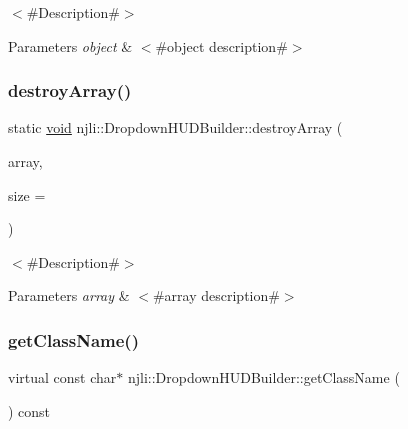 $<$\#\+Description\#$>$


\begin{DoxyParams}{Parameters}
{\em object} & $<$\#object description\#$>$ \\
\hline
\end{DoxyParams}
\mbox{\label{classnjli_1_1_dropdown_h_u_d_builder_a6bfd29a4923eae10fa7fa75941e13356}} 
\subsubsection{\texorpdfstring{destroy\+Array()}{destroyArray()}}
{\footnotesize\ttfamily static \mbox{\hyperlink{_thread_8h_af1e856da2e658414cb2456cb6f7ebc66}{void}} njli\+::\+Dropdown\+H\+U\+D\+Builder\+::destroy\+Array (\begin{DoxyParamCaption}\item[{\mbox{\hyperlink{classnjli_1_1_dropdown_h_u_d_builder}{Dropdown\+H\+U\+D\+Builder}} $\ast$$\ast$}]{array,  }\item[{const \mbox{\hyperlink{_util_8h_a10e94b422ef0c20dcdec20d31a1f5049}{u32}}}]{size = {} }\end{DoxyParamCaption})\hspace{0.3cm}{\ttfamily [static]}}

$<$\#\+Description\#$>$


\begin{DoxyParams}{Parameters}
{\em array} & $<$\#array description\#$>$ \\
\hline
\end{DoxyParams}
\mbox{\label{classnjli_1_1_dropdown_h_u_d_builder_a8b15b43699ca6f22f5226d2ac14bc38c}} 
\subsubsection{\texorpdfstring{get\+Class\+Name()}{getClassName()}}
{\footnotesize\ttfamily virtual const char$\ast$ njli\+::\+Dropdown\+H\+U\+D\+Builder\+::get\+Class\+Name (\begin{DoxyParamCaption}{ }\end{DoxyParamCaption}) const\hspace{0.3cm}{\ttfamily [virtual]}}

